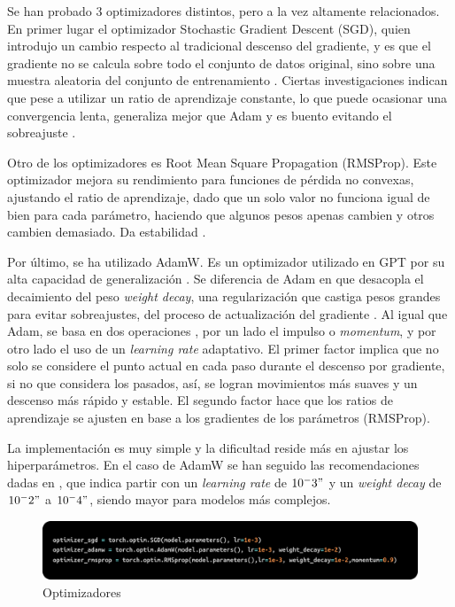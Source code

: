 \documentclass[11pt]{book}
\theoremstyle{plain}
\theoremstyle{definition}
\begin{document}
Se han probado 3 optimizadores distintos, pero a la vez altamente relacionados. En primer lugar el optimizador Stochastic Gradient Descent (SGD), quien introdujo un cambio respecto al tradicional descenso del gradiente, y es que el gradiente no se calcula sobre todo el conjunto de datos original, sino sobre una muestra aleatoria del conjunto de entrenamiento \parencite{geeksforgeeks_sgd}. Ciertas investigaciones indican que pese a utilizar un ratio de aprendizaje constante, lo que puede ocasionar una convergencia lenta, generaliza mejor que Adam y es buento evitando el sobreajuste \parencite{ultralytics_adam_glossary}. 

Otro de los optimizadores es Root Mean Square Propagation (RMSProp). Este optimizador mejora su rendimiento para funciones de pérdida no convexas, ajustando el ratio de aprendizaje, dado que un solo valor no funciona igual de bien para cada parámetro, haciendo que algunos pesos apenas cambien y otros cambien demasiado. Da estabilidad \parencite{kashyap2024rmsprop}.

Por último, se ha utilizado AdamW. Es un optimizador utilizado en GPT por su alta capacidad de generalización . Se diferencia de Adam en que desacopla el decaimiento del peso \textit{weight decay}, una regularización que castiga pesos grandes para evitar sobreajustes, del proceso de actualización del gradiente \parencite{datacamp_adamw_pytorch}.  Al igual que Adam, se basa en dos operaciones \parencite{yassin2024adamvsadamw}, por un lado el impulso o \textit{momentum}, y por otro lado el uso de un \textit{learning rate} adaptativo. El primer factor implica que no solo se considere el punto actual en cada paso durante el descenso por gradiente, si no que considera los pasados, así, se logran movimientos más suaves y un descenso más rápido y estable. El segundo factor hace que los ratios de aprendizaje se ajusten en base a los gradientes de los parámetros (RMSProp).

La implementación es muy simple y la dificultad reside más en ajustar los hiperparámetros. En el caso de AdamW se han seguido las recomendaciones dadas en \parencite{datacamp_adamw_pytorch}, que indica partir con un \textit{learning rate} de $10^-3"$ y un \textit{weight decay} de $10^-2"$ a $10^-4"$, siendo mayor para modelos más complejos. 


\begin{figure}[h]
    \centering
    \includegraphics[width=0.5\linewidth]{img/optimizers.png}
    \caption{Optimizadores \parencite{stackoverflow_sgd_optimizer}}
    \label{fig:placeholder22}
\end{figure}
\end{document}
